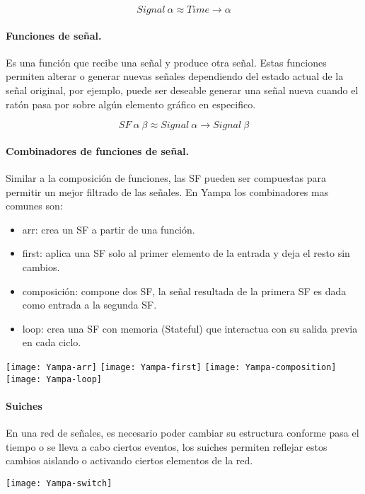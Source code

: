 \documentclass{standalone}
\begin{document}
\begin{equation}
Signal \ \alpha \approx Time \rightarrow \alpha
\end{equation}

\paragraph{Funciones de señal.}
Es una función que recibe una señal y produce otra señal. Estas funciones permiten alterar o generar nuevas señales dependiendo del estado actual de la señal original, por ejemplo, puede ser deseable generar una señal nueva cuando el ratón pasa por sobre algún elemento gráfico en especifico.

\begin{equation}
SF \ \alpha \ \beta \approx Signal \ \alpha \rightarrow Signal \ \beta
\end{equation}

\paragraph{Combinadores de funciones de señal.}
Similar a la composición de funciones, las SF pueden ser compuestas para permitir un mejor filtrado de las señales. En Yampa los combinadores mas comunes son:

\begin{itemize}
\item arr: crea un SF a partir de una función.
\item first: aplica una SF solo al primer elemento de la entrada y deja el resto sin cambios.
\item composición: compone dos SF, la señal resultada de la primera SF es dada como entrada a la segunda SF.
\item loop: crea una SF con memoria (Stateful) que interactua con su salida previa en cada ciclo.
\end{itemize}
\texttt{[image: Yampa-arr]}
\texttt{[image: Yampa-first]}
\texttt{[image: Yampa-composition]}
\texttt{[image: Yampa-loop]}
\paragraph{Suiches}
En una red de señales, es necesario poder cambiar su estructura conforme pasa el tiempo o se lleva a cabo ciertos eventos, los suiches permiten reflejar estos cambios aislando o activando ciertos elementos de la red.

\texttt{[image: Yampa-switch]}
\end{document}
